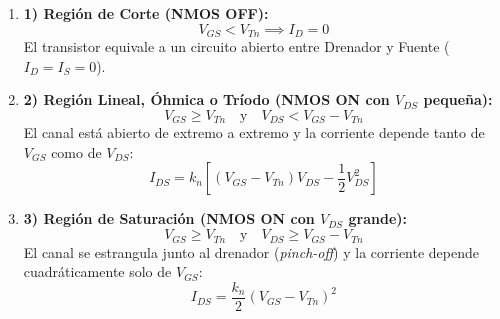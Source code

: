 \begin{ley}
\begin{enumerate}[leftmargin=*]
    \item \textbf{1) Región de Corte (NMOS OFF):}
    \begin{equation}
        V_{GS} < V_{Tn} \implies I_D = 0
    \end{equation}
    El transistor equivale a un circuito abierto entre Drenador y Fuente ($I_D = I_S = 0$).

    \item \textbf{2) Región Lineal, Óhmica o Tríodo (NMOS ON con $V_{DS}$ pequeña):}
    \begin{equation}
        V_{GS} \ge V_{Tn} \quad \text{y} \quad V_{DS} < V_{GS} - V_{Tn}
    \end{equation}
    El canal está abierto de extremo a extremo y la corriente depende tanto de $V_{GS}$ como de $V_{DS}$:
    \begin{equation}
        I_{DS} = k_n \left[ (V_{GS} - V_{Tn}) V_{DS} - \frac{1}{2} V_{DS}^2 \right]
    \end{equation}

    \item \textbf{3) Región de Saturación (NMOS ON con $V_{DS}$ grande):}
    \begin{equation}
        V_{GS} \ge V_{Tn} \quad \text{y} \quad V_{DS} \ge V_{GS} - V_{Tn}
    \end{equation}
    El canal se estrangula junto al drenador (\textit{pinch-off}) y la corriente depende cuadráticamente solo de $V_{GS}$:
    \begin{equation}
        I_{DS} = \frac{k_n}{2} (V_{GS} - V_{Tn})^2
    \end{equation}
\end{enumerate}
\end{ley}


